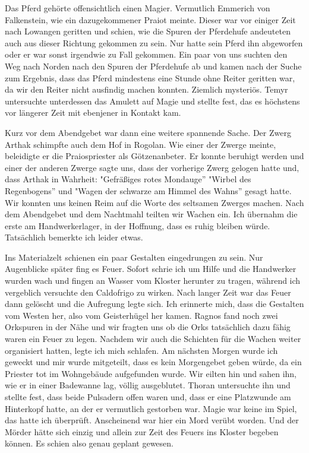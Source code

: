 Das Pferd gehörte offensichtlich einen Magier. Vermutlich Emmerich von Falkenstein, wie ein dazugekommener Praiot meinte. Dieser war vor einiger Zeit nach Lowangen geritten und schien, wie die Spuren der Pferdehufe andeuteten auch aus dieser Richtung gekommen zu sein. Nur hatte sein Pferd ihn abgeworfen oder er war sonst irgendwie zu Fall gekommen. Ein paar von uns suchten den Weg nach Norden nach den Spuren der Pferdehufe ab und kamen nach der Suche zum Ergebnis, dass das Pferd mindestens eine Stunde ohne Reiter geritten war, da wir den Reiter nicht ausfindig machen konnten. Ziemlich mysteriös. Temyr untersuchte unterdessen das Amulett auf Magie und stellte fest, das es höchstens vor längerer Zeit mit ebenjener in Kontakt kam.\par

Kurz vor dem Abendgebet war dann eine weitere spannende Sache. Der Zwerg Arthak schimpfte auch dem Hof in Rogolan. Wie einer der Zwerge meinte, beleidigte er die Praiospriester als Götzenanbeter. Er konnte beruhigt werden und einer der anderen Zwerge sagte uns, dass der vorherige Zwerg gelogen hatte und, dass Arthak in Wahrheit: "Gefräßiges rotes Mondauge'' "Wirbel des Regenbogens'' und "Wagen der schwarze am Himmel des Wahns'' gesagt hatte. Wir konnten uns keinen Reim auf die Worte des seltsamen Zwerges machen. Nach dem Abendgebet und dem Nachtmahl teilten wir Wachen ein. Ich übernahm die erste am Handwerkerlager, in der Hoffnung, dass es ruhig bleiben würde. Tatsächlich bemerkte ich leider etwas.\par

Ins Materialzelt schienen ein paar Gestalten eingedrungen zu sein. Nur Augenblicke später fing es Feuer. Sofort schrie ich um Hilfe und die Handwerker wurden wach und fingen an Wasser vom Kloster herunter zu tragen, während ich vergeblich versuchte den Caldofrigo zu wirken. Nach langer Zeit war das Feuer dann gelöscht und die Aufregung legte sich. Ich erinnerte mich, dass die Gestalten vom Westen her, also vom Geisterhügel her kamen. Ragnos fand noch zwei Orkspuren in der Nähe und wir fragten uns ob die Orks tatsächlich dazu fähig waren ein Feuer zu legen. Nachdem wir auch die Schichten für die Wachen weiter organisiert hatten, legte ich mich schlafen. Am nächsten Morgen wurde ich geweckt und mir wurde mitgeteilt, dass es kein Morgengebet geben würde, da ein Priester tot im Wohngebäude aufgefunden wurde. Wir eilten hin und sahen ihn, wie er in einer Badewanne lag, völlig ausgeblutet. Thoran untersuchte ihn und stellte fest, dass beide Pulsadern offen waren und, dass er eine Platzwunde am Hinterkopf hatte, an der er vermutlich gestorben war. Magie war keine im Spiel, das hatte ich überprüft. Anscheinend war hier ein Mord verübt worden. Und der Mörder hätte sich einzig und allein zur Zeit des Feuers ins Kloster begeben können. Es schien also genau geplant gewesen. \par

